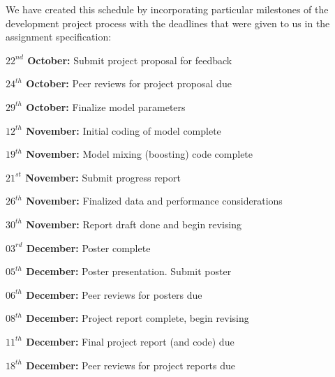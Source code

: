 \documentclass{pset}
\begin{document}
We have created this schedule by incorporating particular milestones of the
development project process with the deadlines that were given to us in the
assignment specification:

{\bf$22^{nd}$ October:} Submit project proposal for feedback

{\bf$24^{th}$ October:} Peer reviews for project proposal due

{\bf$29^{th}$ October:} Finalize model parameters

{\bf$12^{th}$ November:} Initial coding of model complete

{\bf$19^{th}$ November:} Model mixing (boosting) code complete

{\bf$21^{st}$ November:} Submit progress report

{\bf$26^{th}$ November:} Finalized data and performance considerations

{\bf$30^{th}$ November:} Report draft done and begin revising

{\bf$03^{rd}$ December:} Poster complete

{\bf$05^{th}$ December:} Poster presentation.  Submit poster

{\bf$06^{th}$ December:} Peer reviews for posters due

{\bf$08^{th}$ December:} Project report complete, begin revising

{\bf$11^{th}$ December:} Final project report (and code) due

{\bf$18^{th}$ December:} Peer reviews for project reports due
\end{document}
